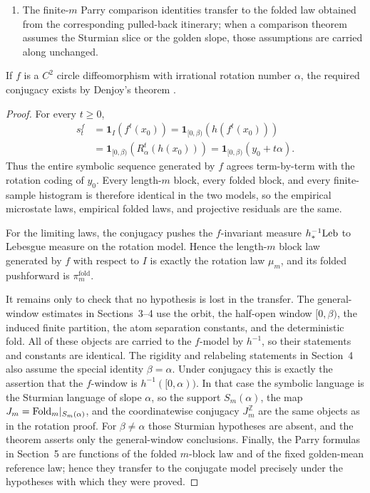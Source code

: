 \begin{theorem}
\begin{enumerate}
Sturmian \(m+1\) discrepancy constant, and the injective-placement comparisons
for the realized Sturmian law, transfer only in the case
\(\beta=\alpha\), equivalently \(I=h^{-1}([0,\alpha))\).
\item The finite-\(m\) Parry comparison identities transfer to the folded law
obtained from the corresponding pulled-back itinerary; when a comparison
theorem assumes the Sturmian slice or the golden slope, those assumptions are
carried along unchanged.
\end{enumerate}
If \(f\) is a \(C^2\) circle diffeomorphism with irrational rotation number
\(\alpha\), the required conjugacy exists by Denjoy's theorem
\cite{Denjoy1932CourbesTore,KatokHasselblatt1995}.
\end{theorem}

\begin{proof}
For every \(t\ge0\),
\[
\begin{aligned}
s_t^f
&=
\mathbf 1_I(f^t(x_0))
=
\mathbf 1_{[0,\beta)}(h(f^t(x_0)))\\
&=
\mathbf 1_{[0,\beta)}(R_\alpha^t(h(x_0)))
=
\mathbf 1_{[0,\beta)}(y_0+t\alpha).
\end{aligned}
\]
Thus the entire symbolic sequence generated by \(f\) agrees term-by-term with
the rotation coding of \(y_0\). Every length-\(m\) block, every folded block,
and every finite-sample histogram is therefore identical in the two models, so
the empirical microstate laws, empirical folded laws, and projective residuals
are the same.

For the limiting laws, the conjugacy pushes the \(f\)-invariant measure
\(h^{-1}_*\mathrm{Leb}\) to Lebesgue measure on the rotation model. Hence the
length-\(m\) block law generated by \(f\) with respect to \(I\) is exactly the
rotation law \(\mu_m\), and its folded pushforward is
\(\pi_m^{\mathrm{fold}}\).

It remains only to check that no hypothesis is lost in the transfer.  The
general-window estimates in Sections~3--4 use the orbit, the half-open window
\([0,\beta)\), the induced finite partition, the atom separation constants,
and the deterministic fold.  All of these objects are carried to the
\(f\)-model by \(h^{-1}\), so their statements and constants are identical.
The rigidity and relabeling statements in Section~4 also assume the special
identity \(\beta=\alpha\).  Under conjugacy this is exactly the assertion that
the \(f\)-window is \(h^{-1}([0,\alpha))\).  In that case the symbolic language
is the Sturmian language of slope \(\alpha\), so the support
\(S_m(\alpha)\), the map \(J_m=\mathrm{Fold}_m|_{S_m(\alpha)}\), and the
coordinatewise conjugacy \(J_m^{\mathbb Z}\) are the same objects as in the
rotation proof.  For \(\beta\ne\alpha\) those Sturmian hypotheses are absent,
and the theorem asserts only the general-window conclusions.  Finally, the
Parry formulas in Section~5 are functions of the folded \(m\)-block law and
of the fixed golden-mean reference law; hence they transfer to the conjugate
model precisely under the hypotheses with which they were proved.
\end{proof}
